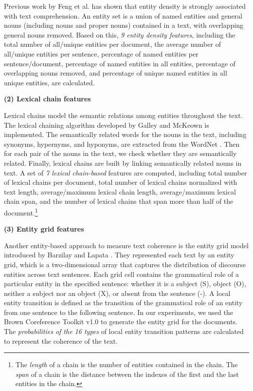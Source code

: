 \documentclass[11pt,letterpaper]{article}
\begin{document}
	Previous work by Feng et al.  has shown that entity density is strongly associated with text comprehension.  An entity set is a union of named entities and general nouns (including nouns and proper nouns) contained in a text, with overlapping general nouns removed. Based on this, {\em 9 entity density features}, including the total number of all/unique entities per document, the average number of all/unique entities per sentence, percentage of named entities per sentence/document, percentage of named entities in all entities, percentage of overlapping nouns removed, and percentage of unique named entities in all unique entities, are calculated.

					
	{\bf (2) Lexical chain features}
	
	Lexical chains model the semantic relations among entities throughout the text. The lexical chaining algorithm developed by Galley and McKeown  is implemented. The semantically related words for the nouns in the text, including synonyms, hypernyms, and hyponyms, are extracted from the WordNet \cite{miller1995wordnet}. Then for each pair of the nouns in the text, we check whether they are semantically related. Finally, lexical chains are built by linking semantically related nouns in text. A set of {\em 7 lexical chain-based} features are computed, including total number of lexical chains per document, total number of lexical chains normalized with text length, average/maximum lexical chain length, average/maximum lexical chain span, and the number of lexical chains that span more than half of the document.\footnote{The {\em length} of a chain is the number of entities contained in the chain. The {\em span} of a chain is the distance between the indexes of the first and the last entities in the chain.}
					
					
	{\bf (3) Entity grid features}
	
	Another entity-based approach to measure text coherence is the entity grid model introduced by Barzilay and Lapata . They represented each text by an entity grid, which is a two-dimensional array that captures the distribution of discourse entities across text sentences. Each grid cell contains the grammatical role of a particular entity in the specified sentence: whether it is a subject (S), object (O), neither a subject nor an object (X), or absent from the sentence (-). A local entity transition is defined as the transition of the grammatical role of an entity from one sentence to the following sentence. In our experiments, we used the Brown Coreference Toolkit v1.0 \cite{eisner2011extending} to generate the entity grid for the documents. The {\em probabilities of the 16 types} of local entity transition patterns are calculated to represent the coherence of the text.
	
\end{document}
